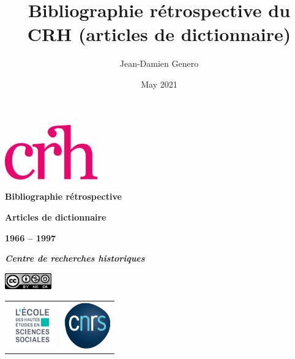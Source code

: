 \documentclass{article}
\title{Bibliographie rétrospective du CRH (articles de dictionnaire)}
\author{Jean-Damien Genero}
\date{May 2021}
\newcommand\blankpage{%
    \null
    \thispagestyle{empty}%
    \addtocounter{page}{-1}%
    \newpage}
\begin{document}
	
\renewcommand{\contentsname}{Sommaire}


\begin{titlepage}
	\begin{center}
		
		\vspace*{1,50cm}
		
		\includegraphics[width=4cm]{../../../img/logo_crh_magenta.png}
		\bigskip
		\bigskip
		\bigskip
		\bigskip
		
		\begin{Huge}
			\textbf{Bibliographie rétrospective}
			
			\bigskip
			
			\bigskip
			
			\textbf{Articles de dictionnaire}
		\end{Huge}
		
		\begin{LARGE}
			\bigskip
			
			\bigskip
			
			\textbf{1966 -- 1997}
			
			\bigskip
			
			\textbf{\emph{Centre de recherches historiques} }\\
		\end{LARGE}
		
		\bigskip
		
		\vspace*{2.25cm}
		
		\includegraphics[width=2cm]{../../../img/licenseccby-nc-sa4.0.png}
		
		\vspace*{3,5cm}
		
		\begin{tabular}{cc}
			\includegraphics[width=2cm]{../../../img/Logo_EHESS_2021_RVB.png} & \includegraphics[width=2cm]{../../../img/cnrslogo.png} \\
		\end{tabular}
		
	\end{center}
	\afterpage{\blankpage}
\end{titlepage}
\end{document}
